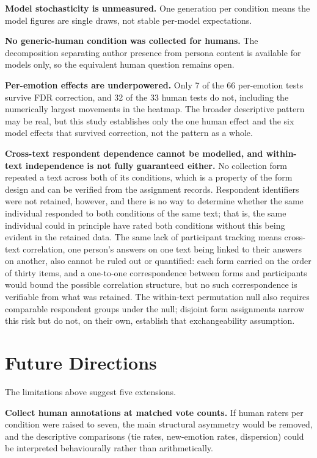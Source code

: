 \textbf{Model stochasticity is unmeasured.} One generation per condition means the model figures
are single draws, not stable per-model expectations.

\textbf{No generic-human condition was collected for humans.} The decomposition separating author
presence from persona content is available for models only, so the equivalent human question
remains open.

\textbf{Per-emotion effects are underpowered.} Only 7 of the 66 per-emotion tests survive FDR
correction, and 32 of the 33 human tests do not, including the numerically largest movements in the
heatmap. The broader descriptive pattern may be real, but this study establishes only the one
human effect and the six model effects that survived correction, not the pattern as a whole.

\textbf{Cross-text respondent dependence cannot be modelled, and within-text independence is not
fully guaranteed either.} No collection form repeated a text across both of its conditions, which
is a property of the form design and can be verified from the assignment records. Respondent
identifiers were not retained, however, and there is no way to determine whether the same
individual responded to both conditions of the same text; that is, the same individual could in
principle have rated both conditions without this being evident in the retained data. The same
lack of participant tracking means cross-text correlation, one person's answers on one text being
linked to their answers on another, also cannot be ruled out or quantified: each form carried on
the order of thirty items, and a one-to-one correspondence between forms and participants would
bound the possible correlation structure, but no such correspondence is verifiable from what was
retained. The within-text permutation null also requires comparable respondent groups under the
null; disjoint form assignments narrow this risk but do not, on their own, establish that
exchangeability assumption.

\section{Future Directions}
\label{disc:future}

\noindent
The limitations above suggest five extensions.

\textbf{Collect human annotations at matched vote counts.} If human raters per condition were
raised to seven, the main structural asymmetry would be removed, and the descriptive comparisons
(tie rates, new-emotion rates, dispersion) could be interpreted behaviourally rather than
arithmetically.

